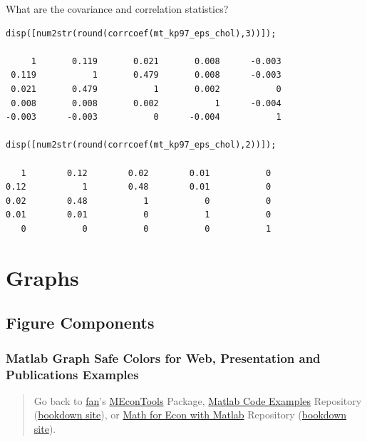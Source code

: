 \documentclass[
]{book}
\begin{document}
What are the covariance and correlation statistics?

\begin{verbatim}
disp([num2str(round(corrcoef(mt_kp97_eps_chol),3))]);

     1       0.119       0.021       0.008      -0.003
 0.119           1       0.479       0.008      -0.003
 0.021       0.479           1       0.002           0
 0.008       0.008       0.002           1      -0.004
-0.003      -0.003           0      -0.004           1

disp([num2str(round(corrcoef(mt_kp97_eps_chol),2))]);

   1        0.12        0.02        0.01           0
0.12           1        0.48        0.01           0
0.02        0.48           1           0           0
0.01        0.01           0           1           0
   0           0           0           0           1
\end{verbatim}

\hypertarget{graphs}{%
\chapter{Graphs}\label{graphs}}

\hypertarget{figure-components}{%
\section{Figure Components}\label{figure-components}}

\hypertarget{matlab-graph-safe-colors-for-web-presentation-and-publications-examples}{%
\subsection{Matlab Graph Safe Colors for Web, Presentation and Publications Examples}\label{matlab-graph-safe-colors-for-web-presentation-and-publications-examples}}

\begin{quote}
Go back to \href{http://fanwangecon.github.io/}{fan}'s \href{https://fanwangecon.github.io/MEconTools/}{MEconTools} Package, \href{https://fanwangecon.github.io/M4Econ/}{Matlab Code Examples} Repository (\href{https://fanwangecon.github.io/M4Econ/bookdown}{bookdown site}), or \href{https://fanwangecon.github.io/Math4Econ/}{Math for Econ with Matlab} Repository (\href{https://fanwangecon.github.io/Math4Econ/bookdown}{bookdown site}).
\end{quote}
\end{document}
